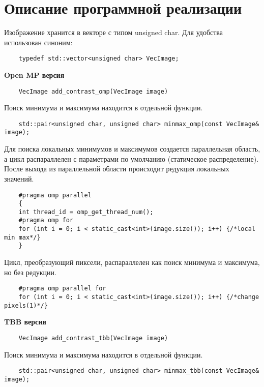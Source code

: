 \documentclass{report}
\begin{document}
    \newpage
    \section*{Описание программной реализации}
    \par Изображение хранится в векторе с типом unsigned char. Для удобства использован синоним:
    \begin{lstlisting}
    typedef std::vector<unsigned char> VecImage;
    \end{lstlisting}
    \textbf{Open MP версия}
    \begin{lstlisting}
    VecImage add_contrast_omp(VecImage image)
    \end{lstlisting}
    \par Поиск минимума и максимума находится в отдельной функции.
    \begin{lstlisting}
    std::pair<unsigned char, unsigned char> minmax_omp(const VecImage& image);
    \end{lstlisting}
    \par Для поиска локальных минимумов и максимумов создается параллельная область, а цикл распараллелен с параметрами по умолчанию (статическое распределение). После выхода из параллельной области происходит редукция локальных значений.
    \begin{lstlisting}
    #pragma omp parallel
    {
    int thread_id = omp_get_thread_num();
    #pragma omp for
    for (int i = 0; i < static_cast<int>(image.size()); i++) {/*local min max*/}
    }
    \end{lstlisting}
    \par Цикл, преобразующий пиксели, распараллелен как поиск минимума и максимума, но без редукции.
    \begin{lstlisting}
    #pragma omp parallel for
    for (int i = 0; i < static_cast<int>(image.size()); i++) {/*change pixels(1)*/}
    \end{lstlisting}
    \newpage
    \textbf{TBB версия}
    \begin{lstlisting}
    VecImage add_contrast_tbb(VecImage image)
    \end{lstlisting}
    \par Поиск минимума и максимума находится в отдельной функции.
    \begin{lstlisting}
    std::pair<unsigned char, unsigned char> minmax_tbb(const VecImage& image);
    \end{lstlisting}
\end{document}
